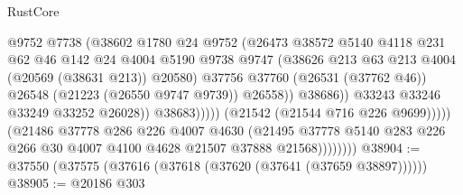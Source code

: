 \begin{lexlean}{RustCore}
\begin{coremodule}
                                        @9752
                                        @7738
                                        (@38602
                                          @1780
                                          @24
                                          @9752
                                          (@26473
                                            @38572
                                            @5140
                                            @4118
                                            @231
                                            @62
                                            @46
                                            @142
                                            @24
                                            @4004
                                            @5190
                                            @9738
                                            @9747
                                            (@38626
                                              @213
                                              @63
                                              @213
                                              @4004
                                              (@20569 (@38631 @213))
                                              @20580)
                                            @37756
                                            @37760
                                            (@26531 (@37762 @46))
                                            @26548
                                            (@21223 (@26550 @9747 @9739))
                                            @26558))
                                        @38686))
                                    @33243
                                    @33246
                                    @33249
                                    @33252
                                    @26028))
                                @38683)))))
                      (@21542 (@21544 @716 @226 @9699)))))
                (@21486
                  @37778
                  @286
                  @226
                  @4007
                  @4630
                  (@21495
                    @37778
                    @5140
                    @283
                    @226
                    @266
                    @30
                    @4007
                    @4100
                    @4628
                    @21507
                    @37888
                    @21568))))))))
@38904 := @37550 (@37575 (@37616 (@37618 (@37620 (@37641 (@37659 @38897))))))
@38905 := @20186 @303

\end{coremodule}
\end{lexlean}
